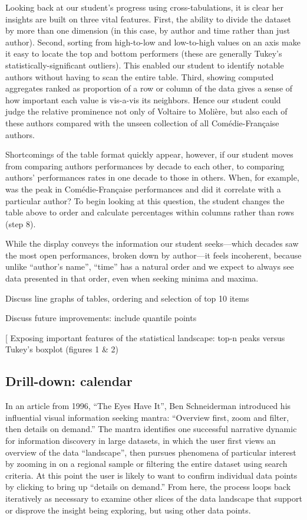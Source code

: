 \documentclass[	DIV=calc,%
							paper=a4,%
							fontsize=11pt,%
							twocolumn]{scrartcl}	 					%
\begin{document}
Looking back at our student’s progress using cross-tabulations, it is clear her insights are built on three vital features.  First, the ability to divide the dataset by more than one dimension (in this case, by author and time rather than just author).  Second, sorting from high-to-low and low-to-high values on an axis make it easy to locate the top and bottom performers (these are generally Tukey’s statistically-significant outliers).  This enabled our student to identify notable authors without having to scan the entire table. Third, showing computed aggregates ranked as proportion of a row or column of the data gives a sense of how important each value is vis-a-vis its neighbors.  Hence our student could judge the relative prominence not only of Voltaire to Molière, but also each of these authors compared with the unseen collection of all Comédie-Française authors.

Shortcomings of the table format quickly appear, however, if our student moves from comparing authors performances by decade to each other, to comparing authors’ performances rates in one decade to those in others.  When, for example, was the peak in Comédie-Française performances and did it correlate with a particular author?  To begin looking at this question, the student changes the table above to order and calculate percentages within columns rather than rows (step 8).

While the display conveys the information our student seeks—which decades saw the most open performances, broken down by author—it feels incoherent, because unlike ``author’s name'', ``time'' has a natural order and we expect to always see data presented in that order, even when seeking minima and maxima.

Discuss line graphs of tables, ordering and selection of top 10 items

Discuss future improvements:  include quantile points


[ Exposing important features of the statistical landscape: top-n peaks versus Tukey’s boxplot (figures 1 \& 2)

\subsection*{Drill-down: calendar}

In an article from 1996, ``The Eyes Have It'', Ben Schneiderman introduced his influential visual information seeking mantra: ``Overview first, zoom and filter, then details on demand.''\cite{Shneiderman:1996}  The mantra identifies one successful narrative dynamic for information discovery in large datasets, in which the user first views an overview of the data ``landscape'', then pursues phenomena of particular interest by zooming in on a regional sample or filtering the entire dataset using search criteria.  At this point the user is likely to want to confirm individual data points by clicking to bring up ``details on demand.''  From here, the process loops back iteratively as necessary to examine other slices of the data landscape that support or disprove the insight being exploring, but using other data points.
\end{document}
